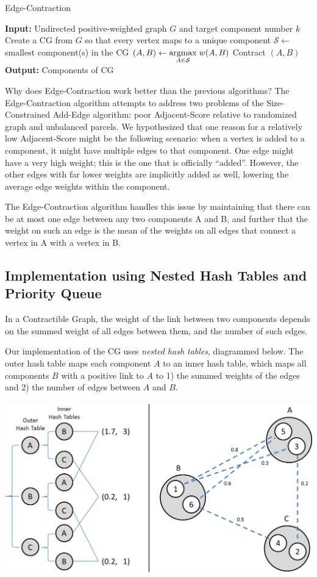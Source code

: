 \begin{algorithm}
\caption{Edge-Contraction}
\begin{algorithmic}
\State \textbf{Input:} Undirected positive-weighted graph $G$ and
       target component number $k$
\State Create a CG from $G$ so that every vertex maps to
       a unique component
\Repeat
\State $\mathcal{S} \gets$ smallest component(s) in the CG
\State $(A,B) \gets \underset{A \in \mathcal{S}}{\mathrm{arg max}}\; w(A,B)$
\State Contract $(A,B)$
\State \textbf{Output:} Components of CG
\end{algorithmic}
\end{algorithm}

Why does Edge-Contraction work better than the previous algorithms?
The Edge-Contraction algorithm attempts to address two problems of
the Size-Constrained Add-Edge algorithm: poor Adjacent-Score relative
to randomized graph and unbalanced parcels. We hypothesized that one
reason for a relatively low Adjacent-Score might be the following
scenario: when a vertex is added to a component, it might have multiple
edges to that component. One edge might have a very high weight; this is
the one that is officially ``added''. However, the other edges with far
lower weights are implicitly added as well, lowering the average edge
weights within the component.

The Edge-Contraction algorithm handles this issue by maintaining that
there can be at most one edge between any two components A and B, and
further that the weight on such an edge is the mean of the weights on
all edges that connect a vertex in A with a vertex in B.

\subsection{Implementation using Nested Hash Tables and Priority Queue}

In a Contractible Graph, the weight of the link between two components
depends on the summed weight of all edges between them, and the number
of such edges.

Our implementation of the CG uses \textit{nested hash tables},
diagrammed below. The outer hash table maps each component $A$ to an
inner hash table, which maps all components $B$ with a positive link to
$A$ to 1) the summed weights of the edges and 2) the number of edges
between $A$ and $B$.

\includegraphics[scale = 0.5]{figs/4_cg_implement}

